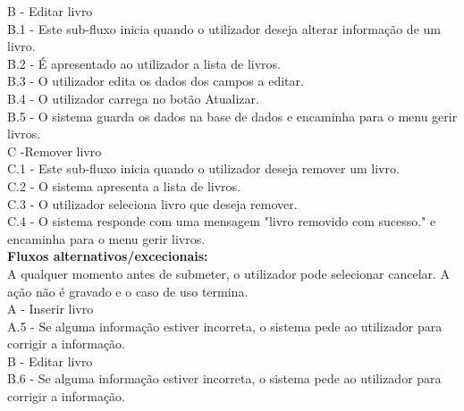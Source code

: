	\indent B - Editar livro \\ 
	\indent\indent B.1 - Este sub-fluxo inicia quando o utilizador deseja alterar informação de um livro.\\
	\indent\indent B.2 - É apresentado ao utilizador a lista de livros.\\
	\indent\indent B.3 - O utilizador edita os dados dos campos a editar.\\
	\indent\indent B.4 - O utilizador carrega no botão Atualizar.\\
	\indent\indent B.5 - O sistema guarda os dados na base de dados e encaminha para o menu gerir livros.\\
	\indent C -Remover livro  \\
	\indent\indent C.1 - Este sub-fluxo inicia quando o utilizador deseja remover um livro.\\
	\indent\indent C.2 - O sistema apresenta a lista de livros.\\
	\indent\indent C.3 - O utilizador seleciona livro que deseja remover.\\
	\indent\indent C.4 - O sistema responde com uma mensagem "livro removido com sucesso." e encaminha para o menu gerir livros.\\
\textbf{Fluxos alternativos/excecionais:}  \\
	\indent A qualquer momento antes de submeter, o utilizador pode selecionar cancelar. A ação não é gravado e o caso de uso termina.\\
	\indent A - Inserir livro\\
	\indent\indent A.5 - Se alguma informação estiver incorreta, o sistema pede ao utilizador para corrigir a informação.\\
	\indent B - Editar livro\\
	\indent\indent B.6 - Se alguma informação estiver incorreta, o sistema pede ao utilizador para corrigir a informação.\\